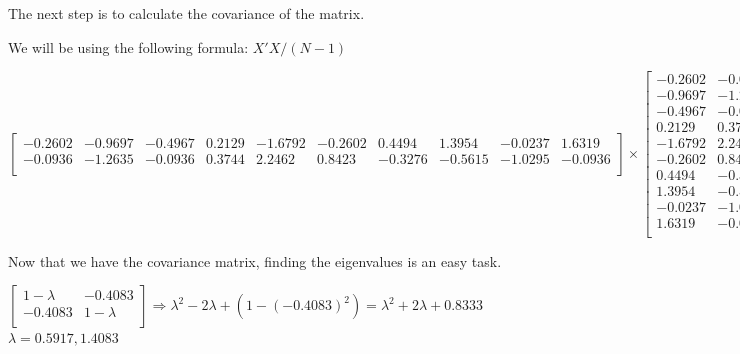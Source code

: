 \documentclass[12pt]{article}
\begin{document}
\noindent
The next step is to calculate the covariance of the matrix.

We will be using the following formula: $X'X/(N-1)$

\begin{center}
$
\begin{bmatrix}
-0.2602 & -0.9697 & -0.4967 & 0.2129 & -1.6792 & -0.2602 & 0.4494 & 1.3954 & -0.0237 & 1.6319\\

-0.0936 & -1.2635 & -0.0936 & 0.3744 & 2.2462 & 0.8423 & -0.3276 & -0.5615 & -1.0295 & -0.0936\\
\end{bmatrix}
\times
\begin{bmatrix}
-0.2602 & -0.0936\\
-0.9697 & -1.2635\\
-0.4967 & -0.0936\\
0.2129 & 0.3744\\
-1.6792 & 2.2462\\
-0.2602 & 0.8423\\
0.4494 & -0.3276\\
1.3954 & -0.5615\\
-0.0237 & -1.0295\\
1.6319 & -0.0936\\
\end{bmatrix}
\times
\frac{1}{9}
=
\begin{bmatrix}
1.0000 & -0.4083 \\
-0.4083 & 1.0000 \\
\end{bmatrix}
$

\end{center}

\noindent
Now that we have the covariance matrix, finding the eigenvalues is an easy task.

\begin{center}
$
\begin{bmatrix}
1 - \lambda & -0.4083\\
-0.4083 & 1 - \lambda \\
\end{bmatrix}
\Rightarrow
\lambda^2 - 2\lambda+(1-(-0.4083)^2)=\lambda^2+2\lambda+0.8333
$
\\
$
\lambda=0.5917, 1.4083
$
\end{center}
\end{document}
